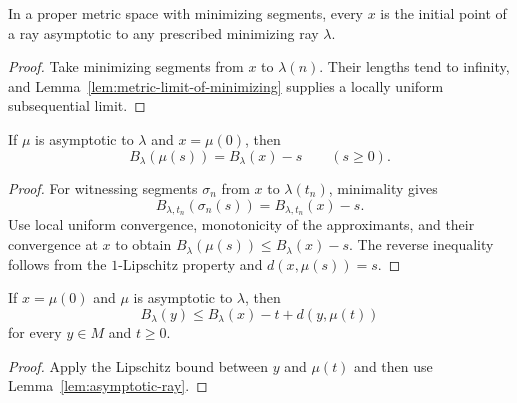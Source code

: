\begin{lemma}
\label{lem:asymptotic-ray-exists}
\leanok




In a proper metric space with minimizing segments, every $x$ is the
initial point of a ray asymptotic to any prescribed minimizing ray
$\lambda$.
\end{lemma}
\begin{proof}
\sketch
\leanok
{}
Take minimizing segments from $x$ to $\lambda(n)$. Their lengths tend
to infinity, and Lemma~\ref{lem:metric-limit-of-minimizing} supplies a
locally uniform subsequential limit.
\end{proof}

\begin{lemma}
\label{lem:asymptotic-ray}
\leanok



If $\mu$ is asymptotic to $\lambda$ and $x=\mu(0)$, then
$$B_\lambda(\mu(s))=B_\lambda(x)-s\qquad(s\ge0).$$
\end{lemma}
\begin{proof}
\sketch
\leanok
{}
For witnessing segments $\sigma_n$ from $x$ to $\lambda(t_n)$,
minimality gives
$$B_{\lambda,t_n}(\sigma_n(s))=B_{\lambda,t_n}(x)-s.$$
Use local uniform convergence, monotonicity of the approximants, and
their convergence at $x$ to obtain
$B_\lambda(\mu(s))\le B_\lambda(x)-s$. The reverse inequality follows
from the $1$-Lipschitz property and $d(x,\mu(s))=s$.
\end{proof}

\begin{corollary}
\label{cor:asymptotic-ray-busemann-bound}
\leanok



If $x=\mu(0)$ and $\mu$ is asymptotic to $\lambda$, then
$$B_\lambda(y)\le B_\lambda(x)-t+d(y,\mu(t))$$
for every $y\in M$ and $t\ge0$.
\end{corollary}
\begin{proof}
\sketch
\leanok
{}
Apply the Lipschitz bound between $y$ and $\mu(t)$ and then use
Lemma~\ref{lem:asymptotic-ray}.
\end{proof}

